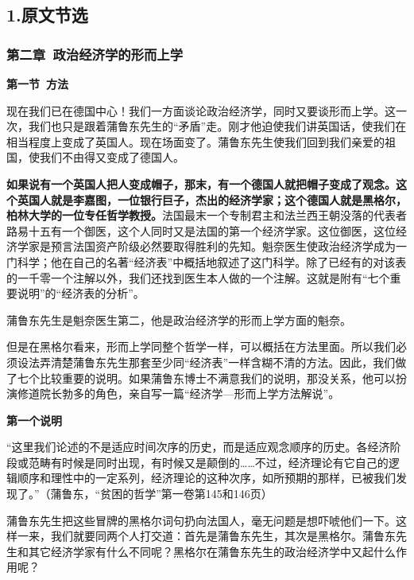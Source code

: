 \documentclass[a4paper,twoside,12pt,AutoFakeBold]{ctexart}
\begin{document}
\subsection{1.原文节选}
\subsubsection{第二章~政治经济学的形而上学}
\begin{center}
    \textbf{第一节~方法}
\end{center}

现在我们已在德国中心！我们一方面谈论政治经济学，同时又要谈形而上学。这一次，我们也只是跟着蒲鲁东先生的“矛盾”走。刚才他迫使我们讲英国话，使我们在相当程度上变成了英国人。现在场面变了。蒲鲁东先生使我们回到我们亲爱的祖国，使我们不由得又变成了德国人。

\textbf{如果说有一个英国人把人变成帽子，那末，有一个德国人就把帽子变成了观念。这个英国人就是李嘉图，一位银行巨子，杰出的经济学家；这个德国人就是黑格尔，柏林大学的一位专任哲学教授。}法国最末一个专制君主和法兰西王朝没落的代表者路易十五有一个御医，这个人同时又是法国的第一个经济学家。这位御医，这位经济学家是预言法国资产阶级必然要取得胜利的先知。魁奈医生使政治经济学成为一门科学；他在自己的名著“经济表”中概括地叙述了这门科学。除了已经有的对该表的一千零一个注解以外，我们还找到医生本人做的一个注解。这就是附有“七个重要说明”的“经济表的分析”。

蒲鲁东先生是魁奈医生第二，他是政治经济学的形而上学方面的魁奈。

但是在黑格尔看来，形而上学同整个哲学一样，可以概括在方法里面。所以我们必须设法弄清楚蒲鲁东先生那套至少同“经济表”一样含糊不清的方法。因此，我们做了七个比较重要的说明。如果蒲鲁东博士不满意我们的说明，那没关系，他可以扮演修道院长勃多的角色，亲自写一篇“经济学—形而上学方法解说”。

\begin{center}
\textbf{第一个说明}    
\end{center}

\begin{fangsong}
    “这里我们论述的不是适应时间次序的历史，而是适应观念顺序的历史。各经济阶段或范畴有时候是同时出现，有时候又是颠倒的……不过，经济理论有它自己的逻辑顺序和理性中的一定系列，经济理论的这种次序，如所预期的那样，已被我们发现了。”（蒲鲁东，“贫困的哲学”第一卷第145和146页）
\end{fangsong}

蒲鲁东先生把这些冒牌的黑格尔词句扔向法国人，毫无问题是想吓唬他们一下。这样一来，我们就要同两个人打交道：首先是蒲鲁东先生，其次是黑格尔。蒲鲁东先生和其它经济学家有什么不同呢？黑格尔在蒲鲁东先生的政治经济学中又起什么作用呢？
\end{document}
